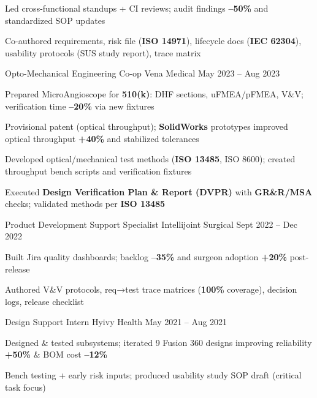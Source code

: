 \documentclass[11pt, a4paper]{russell}
\begin{document}
\begin{cventries}
{\begin{cvitems}
  \item {Led cross-functional standups + CI reviews; audit findings \textbf{--50\%} and standardized SOP updates}
  \item {Co-authored requirements, risk file (\textbf{ISO 14971}), lifecycle docs (\textbf{IEC 62304}), usability protocols (SUS study report), trace matrix}
    \end{cvitems}
  }
\cventry
  {Opto-Mechanical Engineering Co-op} %
  {Vena Medical} %
  {} %
  {May 2023 -- Aug 2023} %
  {
    \begin{cvitems}
        \item {Prepared MicroAngioscope for \textbf{510(k)}: DHF sections, uFMEA/pFMEA, V\&V; verification time \textbf{--20\%} via new fixtures}
  \item {Provisional patent (optical throughput); \textbf{SolidWorks} prototypes improved optical throughput \textbf{+40\%} and stabilized tolerances}
  \item {Developed optical/mechanical test methods (\textbf{ISO 13485}, ISO 8600); created throughput bench scripts and verification fixtures}
  \item {Executed \textbf{Design Verification Plan \& Report (DVPR)} with \textbf{GR\&R/MSA} checks; validated methods per \textbf{ISO 13485}}
    \end{cvitems}
  }
\cventry
  {Product Development Support Specialist} %
  {Intellijoint Surgical} %
  {} %
  {Sept 2022 -- Dec 2022} %
  {
    \begin{cvitems}
        \item {Built Jira quality dashboards; backlog \textbf{--35\%} and surgeon adoption \textbf{+20\%} post-release}
  \item {Authored V\&V protocols, req→test trace matrices (\textbf{100\%} coverage), decision logs, release checklist}
    \end{cvitems}
  }
\cventry
  {Design Support Intern} %
  {Hyivy Health} %
  {} %
  {May 2021 -- Aug 2021} %
  {
    \begin{cvitems}
        \item {Designed \& tested subsystems; iterated 9 Fusion 360 designs improving reliability \textbf{+50\%} \& BOM cost \textbf{--12\%}}
  \item {Bench testing + early risk inputs; produced usability study SOP draft (critical task focus)}
    \end{cvitems}
  }
\end{cventries}
\end{document}
